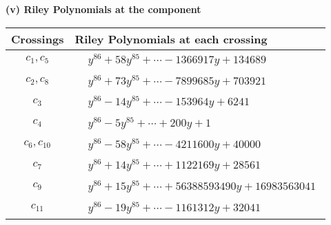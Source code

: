 \documentclass[1p]{elsarticle_modified}
\theoremstyle{definition}
\begin{document}
\newpage\renewcommand{\arraystretch}{1}
\flushleft \textbf{(v) Riley Polynomials at the component}\newline \\
\begin{tabular}{m{50pt}|m{274pt}}
Crossings & \hspace{64pt}Riley Polynomials at each crossing \\
\hline $$\begin{aligned}c_{1},c_{5}\end{aligned}$$&$\begin{aligned}
&y^{86}+58 y^{85}+\cdots-1366917 y+134689
\end{aligned}$\\
\hline $$\begin{aligned}c_{2},c_{8}\end{aligned}$$&$\begin{aligned}
&y^{86}+73 y^{85}+\cdots-7899685 y+703921
\end{aligned}$\\
\hline $$\begin{aligned}c_{3}\end{aligned}$$&$\begin{aligned}
&y^{86}-14 y^{85}+\cdots-153964 y+6241
\end{aligned}$\\
\hline $$\begin{aligned}c_{4}\end{aligned}$$&$\begin{aligned}
&y^{86}-5 y^{85}+\cdots+200 y+1
\end{aligned}$\\
\hline $$\begin{aligned}c_{6},c_{10}\end{aligned}$$&$\begin{aligned}
&y^{86}-58 y^{85}+\cdots-4211600 y+40000
\end{aligned}$\\
\hline $$\begin{aligned}c_{7}\end{aligned}$$&$\begin{aligned}
&y^{86}+14 y^{85}+\cdots+1122169 y+28561
\end{aligned}$\\
\hline $$\begin{aligned}c_{9}\end{aligned}$$&$\begin{aligned}
&y^{86}+15 y^{85}+\cdots+56388593490 y+16983563041
\end{aligned}$\\
\hline $$\begin{aligned}c_{11}\end{aligned}$$&$\begin{aligned}
&y^{86}-19 y^{85}+\cdots-1161312 y+32041
\end{aligned}$\\
\hline
\end{tabular}\\~\\
\end{document}
